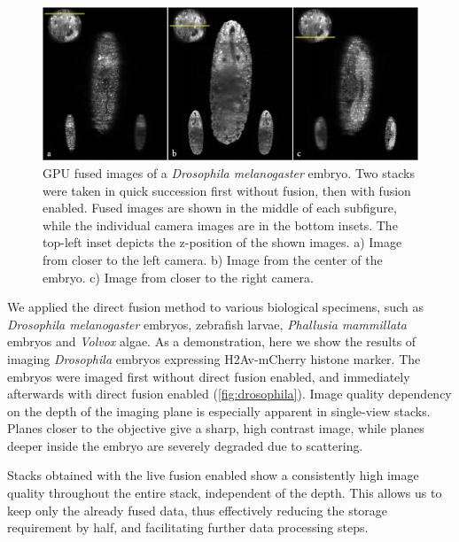   \begin{figure}[bht]
    \centering
    \includegraphics[width=1\textwidth]{fusion/drosophila_D2}
    \caption{ GPU fused images of a \textit{Drosophila melanogaster} embryo. Two stacks were taken in quick succession first without fusion, then with fusion enabled. Fused images are shown in the middle of each subfigure, while the individual camera images are in the bottom insets. The top-left inset depicts the z-position of the shown images. a) Image from closer to the left camera. b) Image from the center of the embryo. c) Image from closer to the right camera.}
    \label{fig:drosophila}
  \end{figure}

  We applied the direct fusion method to various biological specimens, such as \textit{Drosophila melanogaster} embryos, zebrafish larvae, \textit{Phallusia mammillata} embryos and \textit{Volvox} algae. As a demonstration, here we show the results of imaging \textit{Drosophila} embryos expressing H2Av-mCherry histone marker. The embryos were imaged first without direct fusion enabled, and immediately afterwards with direct fusion enabled (\autoref{fig:drosophila}). Image quality dependency on the depth of the imaging plane is especially apparent in single-view stacks. Planes closer to the objective give a sharp, high contrast image, while planes deeper inside the embryo are severely degraded due to scattering.

  Stacks obtained with the live fusion enabled show a consistently high image quality throughout the entire stack, independent of the depth. This allows us to keep only the already fused data, thus effectively reducing the storage requirement by half, and facilitating further data processing steps.

  



